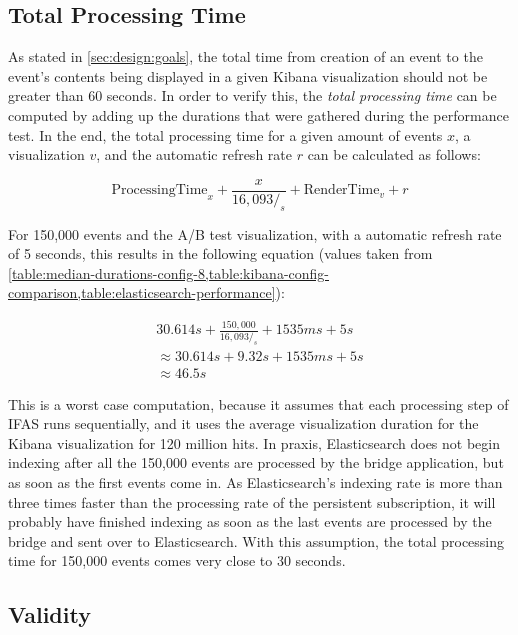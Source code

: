 \subsection{Total Processing Time}
\label{subsec:evaluation:performance:total-processing-time}

As stated in \cref{sec:design:goals}, the total time from creation of an event to the event's contents being displayed in a given Kibana visualization should not be greater than 60 seconds.
In order to verify this, the \emph{total processing time} can be computed by adding up the durations that were gathered during the performance test.
In the end, the total processing time for a given amount of events $x$, a visualization $v$, and the automatic refresh rate $r$ can be calculated as follows:

$$ \text{ProcessingTime}_x + \frac{x}{16,093/_s} + \text{RenderTime}_v + r$$

For 150,000 events and the A/B test visualization, with a automatic refresh rate of 5 seconds, this results in the following equation (values taken from \cref{table:median-durations-config-8,table:kibana-config-comparison,table:elasticsearch-performance}):

\begin{align*}
30.614s + \frac{150,000}{16,093/_s} + 1535ms + 5s \\
\approx 30.614s + 9.32s + 1535ms + 5s \\
\approx 46.5s 
\end{align*}

This is a worst case computation, because it assumes that each processing step of \ac{IFAS} runs sequentially, and it uses the average visualization duration for the Kibana visualization for 120 million hits.
In praxis, Elasticsearch does not begin indexing after all the 150,000 events are processed by the bridge application, but as soon as the first events come in.
As Elasticsearch's indexing rate is more than three times faster than the processing rate of the persistent subscription, it will probably have finished indexing as soon as the last events are processed by the bridge and sent over to Elasticsearch.
With this assumption, the total processing time for 150,000 events comes very close to 30 seconds.

\subsection{Validity}
\label{subec:evaluation:user:validity}

